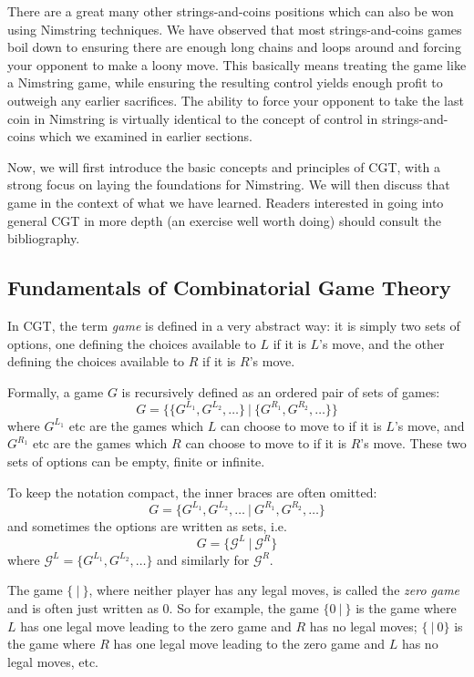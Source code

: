 \documentclass[a4paper,twocolumn]{article}
\newcommand{\cgtgame}[2]{\{#1 \:|\: #2\}}
\begin{document}
There are a great many other strings-and-coins positions which can
also be won using Nimstring techniques. We have observed that most
strings-and-coins games boil down to ensuring there are enough long chains
and loops around and forcing your opponent to make a loony move. This
basically means treating the game like a Nimstring game, while ensuring the
resulting control yields enough profit to outweigh any earlier sacrifices.
The ability to force your opponent to take the last coin in Nimstring is
virtually identical to the concept of control in strings-and-coins which we
examined in earlier sections.

Now, we will first introduce the basic concepts and principles of CGT,
with a strong focus on laying the foundations for Nimstring. We will
then discuss that game in the context of what we have learned. Readers
interested in going into general CGT in more depth (an exercise well
worth doing) should consult the bibliography.

\subsection{Fundamentals of Combinatorial Game Theory}

In CGT, the term \emph{game} is defined in a very abstract way: it is
simply two sets of options, one defining the choices available to $L$
if it is $L$'s move, and the other defining the choices available to
$R$ if it is $R$'s move.

Formally, a game $G$ is recursively defined as an ordered pair of sets
of games: $$G = \cgtgame{\{G^{L_1}, G^{L_2}, \ldots\}}{\{G^{R_1},
  G^{R_2}, \ldots\}}$$ where $G^{L_1}$ etc are the games which $L$ can
choose to move to if it is $L$'s move, and $G^{R_1}$ etc are the games
which $R$ can choose to move to if it is $R$'s move. These two sets of
options can be empty, finite or infinite.

To keep the notation compact, the inner braces are often omitted:
$$G = \cgtgame{G^{L_1}, G^{L_2}, \ldots}{G^{R_1}, G^{R_2}, \ldots}$$
and sometimes the options are written as sets, i.e. $$G =
\cgtgame{\mathcal{G}^L}{\mathcal{G}^R}$$ where $\mathcal{G}^L =
\{G^{L_1}, G^{L_2}, \ldots\}$ and similarly for $\mathcal{G}^R$.

The game $\cgtgame{}{}$, where neither player has any legal moves, is
called the \emph{zero game} and is often just written as $0$. So for
example, the game $\cgtgame{0}{}$ is the game where $L$ has one legal
move leading to the zero game and $R$ has no legal moves;
$\cgtgame{}{0}$ is the game where $R$ has one legal move leading to
the zero game and $L$ has no legal moves, etc.
\end{document}
